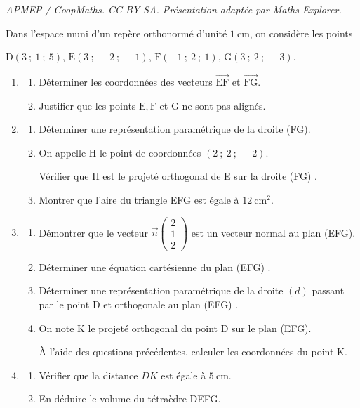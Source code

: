 \documentclass[10pt]{article}
\begin{document}
\noindent\textit{APMEP / CoopMaths. CC BY-SA. Présentation adaptée par Maths Explorer.}\par\medskip
\medskip

Dans l'espace muni d'un repère orthonormé d'unité $1 \mathrm{~cm}$, on considère les points

\begin{center}$\mathrm{D}(3~;~1~;~5)$, \qquad 
$\mathrm{E}(3~;~-2~;~-1)$, \qquad 
$\mathrm{F}(-1~;~2~;~1)$, \qquad 
$\mathrm{G}(3~;~2~;~-3)$.\end{center}

\smallskip

\begin{enumerate}
\item 
	\begin{enumerate}
		\item Déterminer les coordonnées des vecteurs $\overrightarrow{\text{EF}}$ et $\overrightarrow{\text{FG}}$.
		\item Justifier que les points $\mathrm{E}, \mathrm{F}$ et $\mathrm{G}$ ne sont pas alignés.
	\end{enumerate}
\item 
	\begin{enumerate}
		\item Déterminer une représentation paramétrique de la droite (FG).
		\item On appelle $\mathrm{H}$ le point de coordonnées $(2~;~2~;~-2)$.

Vérifier que $\mathrm{H}$ est le projeté orthogonal de E sur la droite (FG) .
		\item Montrer que l'aire du triangle EFG est égale à $12\mathrm{~cm}^{2}$.
	\end{enumerate}
\item 
	\begin{enumerate}
		\item Démontrer que le vecteur $\vec{n}\begin{pmatrix}2 \\ 1 \\ 2\end{pmatrix}$ est un vecteur normal au plan (EFG).
		\item Déterminer une équation cartésienne du plan (EFG) .
		\item Déterminer une représentation paramétrique de la droite $(d)$ passant par le point $\mathrm{D}$ et orthogonale au plan (EFG) .
		\item On note K le projeté orthogonal du point D sur le plan (EFG).

À l'aide des questions précédentes, calculer les coordonnées du point $\mathrm{K}$.
	\end{enumerate}
\item 
	\begin{enumerate}
		\item Vérifier que la distance $D K$ est égale à $5 \mathrm{~cm}$.
		\item En déduire le volume du tétraèdre DEFG.
	\end{enumerate}
\end{enumerate}

\bigskip
\end{document}
